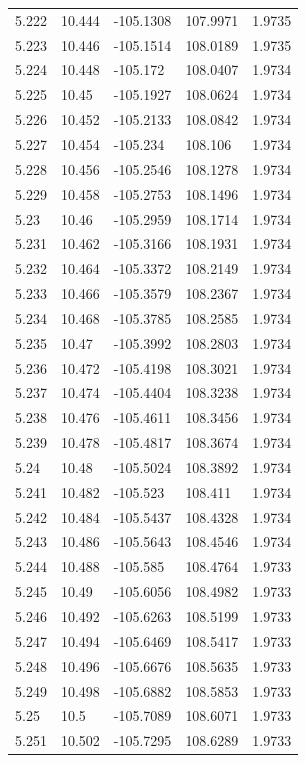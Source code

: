 \begin{tabular}{lllll}
5.222 & 10.444 & -105.1308 & 107.9971 & 1.9735 \\
5.223 & 10.446 & -105.1514 & 108.0189 & 1.9735 \\
5.224 & 10.448 & -105.172 & 108.0407 & 1.9734 \\
5.225 & 10.45 & -105.1927 & 108.0624 & 1.9734 \\
5.226 & 10.452 & -105.2133 & 108.0842 & 1.9734 \\
5.227 & 10.454 & -105.234 & 108.106 & 1.9734 \\
5.228 & 10.456 & -105.2546 & 108.1278 & 1.9734 \\
5.229 & 10.458 & -105.2753 & 108.1496 & 1.9734 \\
5.23 & 10.46 & -105.2959 & 108.1714 & 1.9734 \\
5.231 & 10.462 & -105.3166 & 108.1931 & 1.9734 \\
5.232 & 10.464 & -105.3372 & 108.2149 & 1.9734 \\
5.233 & 10.466 & -105.3579 & 108.2367 & 1.9734 \\
5.234 & 10.468 & -105.3785 & 108.2585 & 1.9734 \\
5.235 & 10.47 & -105.3992 & 108.2803 & 1.9734 \\
5.236 & 10.472 & -105.4198 & 108.3021 & 1.9734 \\
5.237 & 10.474 & -105.4404 & 108.3238 & 1.9734 \\
5.238 & 10.476 & -105.4611 & 108.3456 & 1.9734 \\
5.239 & 10.478 & -105.4817 & 108.3674 & 1.9734 \\
5.24 & 10.48 & -105.5024 & 108.3892 & 1.9734 \\
5.241 & 10.482 & -105.523 & 108.411 & 1.9734 \\
5.242 & 10.484 & -105.5437 & 108.4328 & 1.9734 \\
5.243 & 10.486 & -105.5643 & 108.4546 & 1.9734 \\
5.244 & 10.488 & -105.585 & 108.4764 & 1.9733 \\
5.245 & 10.49 & -105.6056 & 108.4982 & 1.9733 \\
5.246 & 10.492 & -105.6263 & 108.5199 & 1.9733 \\
5.247 & 10.494 & -105.6469 & 108.5417 & 1.9733 \\
5.248 & 10.496 & -105.6676 & 108.5635 & 1.9733 \\
5.249 & 10.498 & -105.6882 & 108.5853 & 1.9733 \\
5.25 & 10.5 & -105.7089 & 108.6071 & 1.9733 \\
5.251 & 10.502 & -105.7295 & 108.6289 & 1.9733 \\

\end{tabular}
